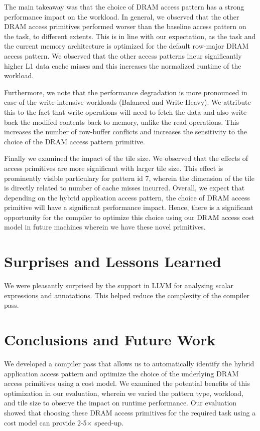 \documentclass[letterpaper]{article}
\begin{document}
The main takeaway was that the choice of DRAM access pattern has a strong
performance impact on the workload. In general, we observed that the other
DRAM access primitives performed worser than the baseline access pattern
on the task, to different extents.
This is in line with our expectation, as the task and the current memory
architecture is optimized for the default row-major DRAM access pattern.
We observed that the other access patterns incur significantly higher L1
data cache misses and this increases the normalized runtime of the workload.

Furthermore, we note that the performance degradation is more
pronounced in case of the write-intensive workloads (Balanced and Write-Heavy).
We attribute this to the fact that write operations will need to 
fetch the data and also write back the modifed contents back to memory,
unlike the read operations. This increases the number of row-buffer
conflicts and increases the sensitivity to the choice of the DRAM access pattern
primitive.

Finally we examined the impact of the tile size. We observed that the effects of
access primitives are more significant with larger tile size. 
This effect is prominently visible particulary for pattern id 7, wherein the
dimension of the tile is directly related to number of cache misses incurred.
Overall, we expect that depending on the hybrid application access pattern,
the choice of DRAM access primitive will have a significant performance impact.
Hence, there is a significant opportunity for the compiler to optimize this
choice using our DRAM access cost model in future machines wherein we have
these novel primitives.

\section{Surprises and Lessons Learned}
We were pleasantly surprised by the support in LLVM for analysing scalar expressions and annotations.
This helped reduce the complexity of the compiler pass.

\section{Conclusions and Future Work}

We developed a compiler pass that allows us to automatically identify the hybrid
application access pattern and optimize the choice of the underlying DRAM access
primitives using a cost model.
We examined the potential benefits of this optimization in our evaluation,
wherein we varied the pattern type, workload, and tile size to observe the
impact on runtime performance.
Our evaluation showed that choosing these DRAM access primitives for
the required task using a cost model can provide 2-5$\times$ speed-up.
\end{document}
